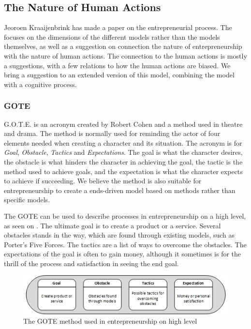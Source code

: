 \subsection{The Nature of Human Actions}
\label{sec:gote}
Jeoroen Kraaijenbrink has made a paper on the entrepreneurial process. The focuses on the dimensions of the different models rather than the models themselves, as well as a suggestion on connection the nature of entrepreneurship with the nature of human actions. The connection to the human actions is mostly a suggestions, with a few relations to how the human actions are biased. We bring a suggestion to an extended version of this model, combining the model with a cognitive process.

\subsubsection*{GOTE}
G.O.T.E. is an acronym created by Robert Cohen and a method used in theatre and drama. The method is normally used for reminding the actor of four elements needed when creating a character and its situation. The acronym is for \emph{Goal}, \emph{Obstacle}, \emph{Tactics} and \emph{Expectations}. The goal is what the character desires, the obstacle is what hinders the character in achieving the goal, the tactic is the method used to achieve goals, and the expectation is what the character expects to achieve if succeeding. We believe the method is also suitable for entrepreneurship to create a ends-driven model based on methods rather than specific models.

The GOTE can be used to describe processes in entrepreneurship on a high level, as seen on . The ultimate goal is to create a product or a service. Several obstacles stands in the way, which are found through existing models, such as Porter's Five Forces. The tactics are a list of ways to overcome the obstacles. The expectations of the goal is often to gain money, although it sometimes is for the thrill of the process and satisfaction in seeing the end goal.

\begin{figure}
\begin{center}
\includegraphics[scale=0.7]{./pics/gote}
\caption{The GOTE method used in entrepreneurship on high level}
\label{fig:gote}
\end{center}
\end{figure}

